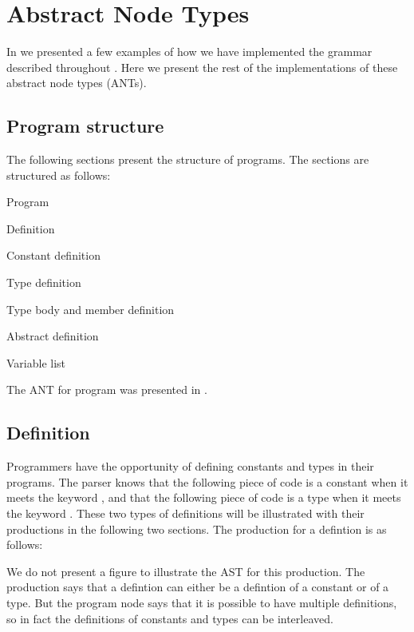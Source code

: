 \chapter{Abstract Node Types}
\label{ap:ant}

In  we presented a few examples of how we have implemented the
grammar described throughout . Here we present the rest of the
implementations of these abstract node types (ANTs). 

\section{Program structure}
The following sections present the structure of programs. The sections are 
structured as follows:

\begin{dlist}
  \item Program
  \item Definition
  \item Constant definition
  \item Type definition
  \item Type body and member definition
  \item Abstract definition
  \item Variable list
\end{dlist}

The ANT for program was presented in .

\section{Definition}
Programmers have the opportunity of defining constants and types in their
programs.  The parser knows that the following piece of code is a constant when
it meets the keyword , and that the following piece of code is a
type when it meets the keyword . These two types of definitions will
be illustrated with their productions in the following two sections. The 
production for a defintion is as follows:

\begin{ebnf}
\end{ebnf}

We do not present a figure to illustrate the AST for this production. The
production says that a defintion can either be a defintion of a constant or of a
type. But the program node says that it is possible to have multiple
definitions, so in fact the definitions of constants and types can be
interleaved.

